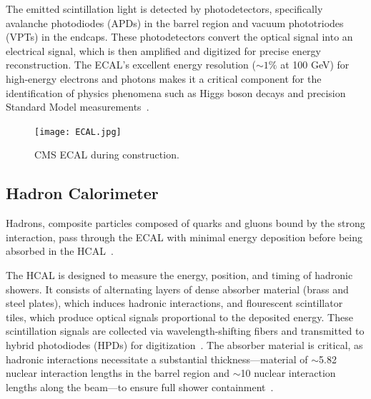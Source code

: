 The emitted scintillation light is detected by photodetectors, specifically avalanche photodiodes (APDs) in the barrel region and vacuum phototriodes (VPTs) in the endcaps. These photodetectors convert the optical signal into an electrical signal, which is then amplified and digitized for precise energy reconstruction. The ECAL’s excellent energy resolution (\(\sim1\%\) at 100 GeV) for high-energy electrons and photons makes it a critical component for the identification of physics phenomena such as Higgs boson decays and precision Standard Model measurements~\cite{CMS:ECALPerf, CMS:ECALTDR, CMS:JINST}.


\begin{figure}[!htb]
    \begin{center}
        \texttt{[image: ECAL.jpg]}
        \caption{CMS ECAL during construction.}
        \label{fig:ECAL}
    \end{center}
\end{figure}




\subsection{Hadron Calorimeter}


Hadrons, composite particles composed of quarks and gluons bound by the strong interaction, pass through the ECAL with minimal energy deposition before being absorbed in the HCAL~\cite{CERN-LHCC-97-031, Mans:1481837}. 

The HCAL is designed to measure the energy, position, and timing of hadronic showers. It consists of alternating layers of dense absorber material (brass and steel plates), which induces hadronic interactions, and flourescent scintillator tiles, which produce optical signals proportional to the deposited energy. These scintillation signals are collected via wavelength-shifting fibers and transmitted to hybrid photodiodes (HPDs) for digitization~\cite{CERN-LHCC-97-031, Mans:1481837}. The absorber material is critical, as hadronic interactions necessitate a substantial thickness---material of $\sim$5.82 nuclear interaction lengths in the barrel region and $\sim$10 nuclear interaction lengths along the beam---to ensure full shower containment~\cite{CERN-LHCC-97-031, Mans:1481837}.

